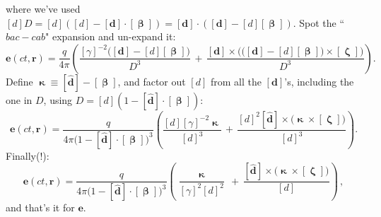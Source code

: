 \documentclass[12pt]{article}
\renewcommand{\vv}[1]{\mathbf{#1}}
\newcommand{\vvbeta}{\bm{\upbeta}}
\newcommand{\vvzeta}{\bm{\upzeta}}
\begin{document}
where we've used $[d]D = [d]([d] - [\vv d] \cdot [\vvbeta]) = [\vv d] \cdot ([\vv d] - [d] [\vvbeta])$. Spot the ``$bac - cab$" expansion and un-expand it:
\begin{equation*}
\vv e (ct, \vv r) = \dfrac{q}{4 \pi} \left(\dfrac{[\gamma]^{-2} \big( [\vv d] - [d] [\vvbeta] \big)}{D^3} \, + \, \dfrac{[\vv d] \times \Big( \big( [\vv d] - [d][\vvbeta] \big) \times [\vvzeta] \Big)}{D^3} \right) .
\end{equation*}
Define $\vv{\upkappa} \equiv [\vv{\hat{d}}] - [\vvbeta]$, and factor out $[d]$ from all the $[\vv d]$'s, including the one in $D$, using ${D = [d](1 - [\vv{\hat{d}}] \cdot [\vvbeta])}$:
\begin{equation*}
\vv e (ct, \vv r) = \dfrac{q}{4 \pi \big( 1 - [\vv{\hat{d}}] \cdot [\vvbeta] \big)^3} \left(\dfrac{[d] [\gamma]^{-2} \vv{\upkappa}}{[d]^3} \, + \, \dfrac{[d]^2 [\vv{\hat{d}}] \times \big( \vv{\upkappa} \times [\vvzeta] \big)}{[d]^3} \right) .
\end{equation*}
Finally(!):
\begin{equation}\label{eq:retepart}
\boxed{ \vv e(ct, \vv r) = \dfrac{q}{4 \pi \big( 1 - [\vv{\hat{d}}] \cdot [\vvbeta] \big)^3} \left( \dfrac{\vv{\upkappa}}{[\gamma]^2 [d]^2} \, + \, \dfrac{[\vv{\hat{d}}] \times \big( \vv{\upkappa} \times [\vvzeta] \big)}{[d]} \right) } \, ,
\end{equation}
and that's it for $\vv e$.
\end{document}

